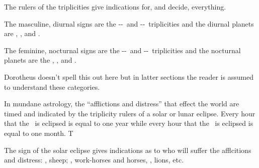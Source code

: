 The rulers of the triplicities give indications for, and decide, everything.

\begin{mdframed}[backgroundcolor=cyan!5, rightmargin=1em, leftmargin=1em]
\small
The masculine, diurnal signs are the \Aries-\Leo-\Sagittarius\, and \Gemini-\Libra-\Aquarius\, triplicities and the diurnal planets are \Sun, \Jupiter, and \Saturn.

The feminine, nocturnal signs are the \Taurus-\Virgo-\Capricorn\, and \Cancer-\Scorpio-\Pisces\, triplicities and the nocturnal planets are the \Moon, \Venus, and \Mars.

Dorotheus doesn't spell this out here but in latter sections the reader is assumed to understand these categories.
\end{mdframed}

In mundane astrology, the ``afflictions and distress'' that effect the world are timed and indicated by the triplicity rulers of a solar or lunar eclipse. Every hour that the \Sun\, is eclipsed is equal to one year while every hour that the \Moon\, is eclipsed is equal to one month. T

The sign of the solar eclipse gives indications as to who will suffer the afflcitions and distress: \Aries, sheep; \Sagittarius, work-horses and horses, \Leo, lions, etc.
